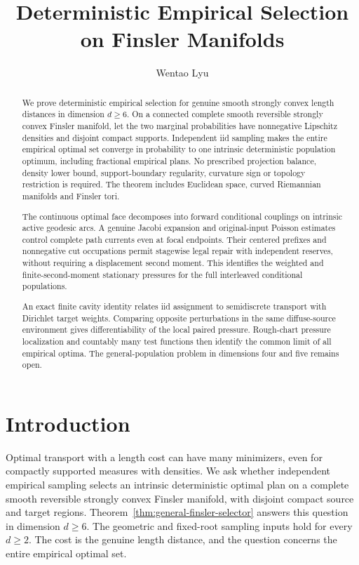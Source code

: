 \documentclass[11pt,reqno]{amsart}
\title[Empirical Selection on Finsler Manifolds]
{Deterministic Empirical Selection on Finsler Manifolds}
\author{Wentao Lyu}
\affil{Shanghai Center for Mathematical Sciences,
Fudan University}
\date{}
\theoremstyle{definition}
\theoremstyle{remark}
\numberwithin{equation}{section}
\begin{document}
\begin{abstract}
We prove deterministic empirical selection for genuine smooth strongly
convex length distances in dimension \(d\ge6\). On a connected complete
smooth reversible strongly convex Finsler manifold, let the two marginal
probabilities have nonnegative Lipschitz densities and disjoint compact
supports. Independent iid sampling makes the entire empirical optimal
set converge in probability to one intrinsic deterministic population
optimum, including fractional empirical plans. No prescribed projection
balance, density lower bound, support-boundary regularity, curvature sign
or topology restriction is required. The theorem includes Euclidean
space, curved Riemannian manifolds and Finsler tori.

The continuous optimal face decomposes into forward conditional
couplings on intrinsic active geodesic arcs. A genuine Jacobi expansion
and original-input Poisson estimates control complete path currents even
at focal endpoints. Their centered prefixes and nonnegative cut
occupations permit stagewise legal repair with independent reserves,
without requiring a displacement second moment. This identifies the
weighted and finite-second-moment stationary pressures for the full
interleaved conditional populations.

An exact finite cavity identity relates iid assignment to semidiscrete
transport with Dirichlet target weights. Comparing opposite perturbations
in the same diffuse-source environment gives differentiability of the
local paired pressure. Rough-chart pressure localization and countably
many test functions then identify the common limit of all empirical
optima. The general-population problem in dimensions four and five
remains open.
\end{abstract}

\maketitle

\section{Introduction}
\label{sec:introduction}

Optimal transport with a length cost can have many minimizers, even for
compactly supported measures with densities. We ask whether independent
empirical sampling selects an intrinsic deterministic optimal plan on a
complete smooth reversible strongly convex Finsler manifold, with
disjoint compact source and target regions. Theorem~\ref{thm:general-finsler-selector}
answers this question in dimension \(d\ge6\).
The geometric and fixed-root sampling inputs hold for
every \(d\ge2\). The cost is the genuine length distance, and the question
concerns the entire empirical optimal set.
\end{document}
